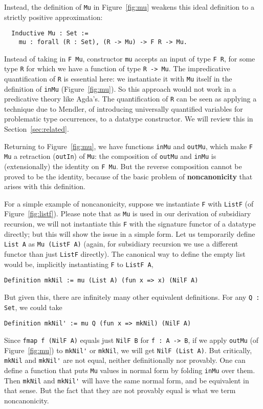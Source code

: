 \documentclass[a4paper,USenglish]{lipics-v2021}
\begin{document}
Instead, the definition of \verb|Mu| in Figure~\ref{fig:mu} weakens
this ideal definition to a strictly positive approximation:
\begin{verbatim}
  Inductive Mu : Set := 
    mu : forall (R : Set), (R -> Mu) -> F R -> Mu.
\end{verbatim}
\noindent Instead of taking in \verb|F Mu|, constructor \verb|mu|
accepts an input of type \verb|F R|, for some type \verb|R| for which
we have a function of type \verb|R -> Mu|.  The impredicative
quantification of \verb|R| is essential here: we instantiate it with
\verb|Mu| itself in the definition of \verb|inMu|
(Figure~\ref{fig:mu}).  So this approach would not work in a
predicative theory like Agda's.  The quantification of \verb|R| can be
seen as applying a technique due to Mendler, of introducing
universally quantified variables for problematic type occurrences, to
a datatype constructor.  We will review this in
Section~\ref{sec:related}.

Returning to Figure~\ref{fig:mu}, we have functions \verb|inMu| and
\verb|outMu|, which make \verb|F Mu| a retraction (\verb|outIn|) of
\verb|Mu|: the composition of \verb|outMu| and \verb|inMu| is
(extensionally) the identity on \verb|F Mu|.  But the reverse
composition cannot be proved to be the identity, because of the basic
problem of \textbf{noncanonicity} that arises with this definition.

For a simple example of noncanonicity, suppose we instantiate \verb|F|
with \verb|ListF| (of Figure~\ref{fig:listf}).  Please note that as
\verb|Mu| is used in our derivation of subsidiary recursion, we will
not instantiate this \verb|F| with the signature functor of a datatype
directly; but this will show the issue in a simple form.  Let us
temporarily define \verb|List A| as \verb|Mu (ListF A)| (again, for
subsidiary recursion we use a different functor than just \verb|ListF|
directly).  The canonical way to define the empty list would be, 
implicitly instantiating \verb|F| to \verb|ListF A|,
\begin{verbatim}
Definition mkNil := mu (List A) (fun x => x) (NilF A)
\end{verbatim}
\noindent But given this, there are infinitely many other equivalent
definitions.  For any \verb|Q : Set|, we could take
\begin{verbatim}
Definition mkNil' := mu Q (fun x => mkNil) (NilF A)
\end{verbatim}
\noindent Since \verb|fmap f (NilF A)| equals just \verb|NilF B| for
\verb|f : A -> B|, if we apply \verb|outMu| (of Figure~\ref{fig:mu})
to \verb|mkNil'| or \verb|mkNil|, we will get \verb|NilF (List A)|.
But critically, \verb|mkNil| and \verb|mkNil'| are not equal, neither
definitionally nor provably.  One can define a function that puts
\verb|Mu| values in normal form by folding \verb|inMu| over them.
Then \verb|mkNil| and \verb|mkNil'| will have the same normal form,
and be equivalent in that sense.  But the fact that they are not
provably equal is what we term noncanonicity.
\end{document}
